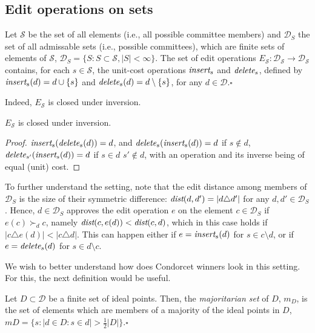 \documentclass{llncs}
\newcommand{\qqed}{\hfill$\square$}
\newcommand{\calD}{\mathcal{D}}
\newcommand{\calS}{\mathcal{S}}
\newcommand{\iinsert}[1]{\emph{insert}_{#1}}
\newcommand{\ddelete}[1]{\emph{delete}_{#1}}
\newcommand{\prefers}[1]{\succ_{#1}}
\newcommand{\dist}{\emph{dist}}
\begin{document}
\subsection{Edit operations on sets}

\begin{definition}
Let $\calS$ be the set of all elements (i.e., all possible committee members) and $\calD_S$ the set of all admissable sets (i.e., possible committees), which are finite sets of elements of $\calS$,   $\calD_S = \{S: S \subset \calS, |S| < \infty\}$. The set of edit operations $E_\calS: \calD_\calS \rightarrow \calD_\calS$ contains, for each $s \in \calS$, the unit-cost operations $\iinsert{s}$ and $\ddelete{s}$, defined by
$\iinsert{s}(d) = d \cup \{s\}$ and $\ddelete{s}(d) = d \setminus \{s\}$, for any $d \in \calD$.\qqed
\end{definition}

Indeed, $E_\calS$ is closed under inversion.

\begin{lemma}
  $E_\calS$ is closed under inversion.
\end{lemma}

\begin{proof}
%
$\iinsert{s}(\ddelete{s}(d)) = d$, and $\ddelete{s}(\iinsert{s}(d)) = d$ if $s \notin d$, $\ddelete{{s'}}(\iinsert{s}(d)) = d$ if $s \in d$ $s' \notin d$, with an operation and its inverse being of equal (unit) cost.  
%
\end{proof}

To further understand the setting, note that the edit distance among members of $\calD_S$ is the size of their symmetric difference:  $\dist(d,d') = |d \triangle d'|$ for any $d, d' \in \calD_S$. Hence,
$d \in \calD_S$ approves the edit operation $e$ on the element $c \in \calD_S$ if $e(c) \prefers{d} c$, namely  $\dist(c, e(d)) < \dist(c, d)$, which in this case holds if $|c \triangle e(d)| < |c \triangle d|$.  This can happen either if $e = \iinsert{s}(d)$ for $s  \in c \setminus d$, or if $e = \ddelete{s}(d)$ for $s  \in d \setminus c$. 

We wish to better understand how does Condorcet winners look in this setting. For this, the next definition would be useful.

\begin{definition}\label{definition:majoritatian-set}
%
Let $D \subset \calD$ be a finite set of ideal points. Then, the \emph{majoritarian set} of $D$, $m_D$, is the set of elements which are members of a majority of the ideal points in $D$, $mD = \{s: |d \in D : s \in d| > \frac{1}{2}{|D|}\}$.\qqed
%
\end{definition}
\end{document}

